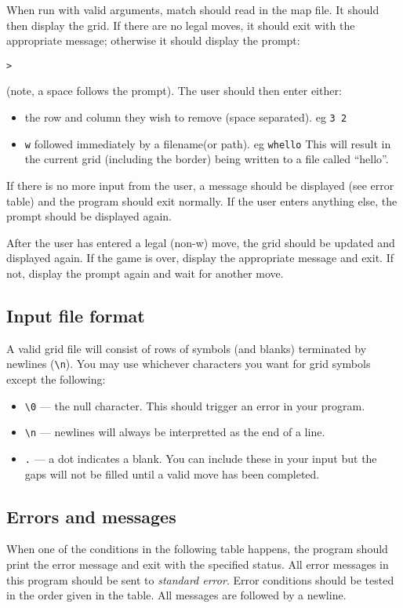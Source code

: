 When run with valid arguments, match should read in the map file.
It should then display the grid.
If there are no legal moves, it should exit with the appropriate message; otherwise it should display the prompt:
\begin{verbatim}
>
\end{verbatim}
(note, a space follows the prompt).
The user should then enter either:
\begin{itemize}
 \item the row and column they wish to remove (space separated). eg \texttt{3 2}
 \item \texttt{w} followed immediately by a filename(or path). eg \texttt{whello}
 This will result in the current grid (including the border) being written to a file called ``hello''.
\end{itemize}
If there is no more input from the user, a message should be displayed (see error table) and
the program should exit normally.
If the user enters anything else, the prompt should be displayed again.

After the user has entered a legal (non-w) move, the grid should be updated and displayed again.
If the game is over, display the appropriate message and exit.
If not, display the prompt again and wait for another move.

\subsection{Input file format}
A valid grid file will consist of rows of symbols (and blanks) terminated by newlines (\verb|\n|).
You may use whichever characters you want for grid symbols except the following:
\begin{itemize}
 \item \verb|\0|          --- the null character. This should trigger an error in your program.
 \item \verb|\n|   --- newlines will always be interpretted as the end of a line.
 \item \verb|.| --- a dot indicates a blank. You can include these in your input but the gaps will not be filled until
 a valid move has been completed.
\end{itemize}

\subsection{Errors and messages}\label{sec:errs}
When one of the conditions in the following table happens, the program should print the error message and exit with
the specified status.
All error messages in this program should be sent to \emph{standard error}.
Error conditions should be tested in the order given in the table.
All messages are followed by a newline.

